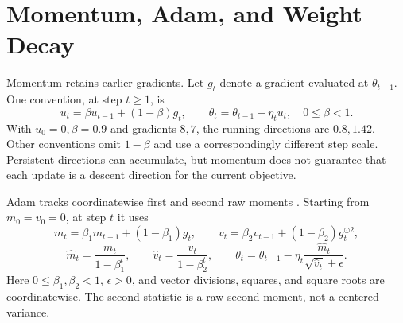 \par\addvspace{\intextsep}\noindent\begin{minipage}{\linewidth}
\centering
{}
\label{fig:training-loop-flow}
\end{minipage}\par\addvspace{\intextsep}

\section{Momentum, Adam, and Weight Decay}

Momentum retains earlier gradients. Let $g_t$ denote a gradient evaluated at $\theta_{t-1}$. One convention, at step $t\geq1$, is
\[
u_t=\beta u_{t-1}+(1-\beta)g_t,
\qquad \theta_t=\theta_{t-1}-\eta_tu_t,
\quad0\leq\beta<1.
\]
With $u_0=0,\beta=0.9$ and gradients $8,7$, the running directions are $0.8,1.42$. Other conventions omit $1-\beta$ and use a correspondingly different step scale. Persistent directions can accumulate, but momentum does not guarantee that each update is a descent direction for the current objective.

Adam tracks coordinatewise first and second raw moments \citep{kingma2015adam}. Starting from $m_0=v_0=0$, at step $t$ it uses
\[
m_t=\beta_1m_{t-1}+(1-\beta_1)g_t,
\qquad
v_t=\beta_2v_{t-1}+(1-\beta_2)g_t^{\odot2},
\]
\[
\hat m_t=\frac{m_t}{1-\beta_1^t},
\qquad \hat v_t=\frac{v_t}{1-\beta_2^t},
\qquad
\theta_t=\theta_{t-1}-\eta_t\frac{\hat m_t}{\sqrt{\hat v_t}+\epsilon}.
\]
Here $0\leq\beta_1,\beta_2<1$, $\epsilon>0$, and vector divisions, squares, and square roots are coordinatewise. The second statistic is a raw second moment, not a centered variance.

